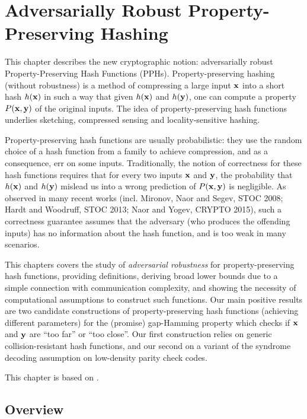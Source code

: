 
\chapter{Adversarially Robust Property-Preserving Hashing}
This chapter describes the new cryptographic notion: adversarially robust Property-Preserving Hash Functions (PPHs). Property-preserving hashing (without robustness) is a method of compressing a large input $\mathbf{{x}}$ into a short hash $h(\mathbf{{x}})$ in such a way that given $h(\mathbf{{x}})$ and $h(\mathbf{{y}})$, one can compute a property $P(\mathbf{{x}},\mathbf{{y}})$ of the original inputs. The idea of property-preserving hash functions underlies sketching, compressed sensing and locality-sensitive hashing.

Property-preserving hash functions are usually probabilistic: they use the random choice of a hash function from a family to achieve compression, and as a consequence, err on some inputs. Traditionally, the notion of correctness for these hash functions requires that for every two inputs $\mathbf{{x}}$ and $\mathbf{{y}}$, the probability that $h(\mathbf{{x}})$ and $h(\mathbf{{y}})$ mislead us into a wrong prediction of $P(\mathbf{{x}},\mathbf{{y}})$ is negligible. As observed in many recent works (incl. Mironov, Naor and Segev, STOC 2008; Hardt and Woodruff, STOC 2013; Naor and Yogev, CRYPTO 2015), such a correctness guarantee assumes that the adversary (who produces the offending inputs) has no information about the hash function, and is too weak in many scenarios.

This chapters covers the study of {\em adversarial robustness} for property-preserving hash functions, providing definitions, deriving broad lower bounds due to a simple connection with communication complexity, and showing the necessity of computational assumptions to construct such functions. Our main positive results are two candidate constructions of property-preserving hash functions (achieving different parameters) for the (promise) gap-Hamming property which checks if $\mathbf{{x}}$ and $\mathbf{{y}}$ are ``too far'' or ``too close''. Our first construction relies on generic collision-resistant hash functions, and our second on a variant of the syndrome decoding assumption on low-density parity check codes.

This chapter is based on \cite{BLV19}.

\section{Overview}\label{sec:pph-intro}


